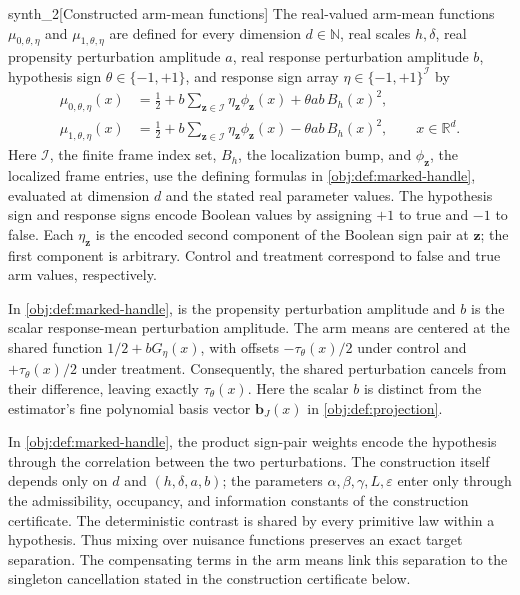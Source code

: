 \documentclass[11pt]{article}
\begin{document}
\begin{definitionv}{synth_2}[Constructed arm-mean functions]
The real-valued arm-mean functions \(\mu_{0,\theta,\eta}\) and \(\mu_{1,\theta,\eta}\) are defined for every dimension \(d\in\mathbb N\), real scales \(h,\delta\), real propensity perturbation amplitude \(a\), real response perturbation amplitude \(b\), hypothesis sign \(\theta\in\{-1,+1\}\), and response sign array \(\eta\in\{-1,+1\}^{\mathcal I}\) by
\[
\begin{aligned}
\mu_{0,\theta,\eta}(x)
&=\frac12+b\sum_{\mathbf z\in\mathcal I}
  \eta_{\mathbf z}\phi_{\mathbf z}(x)
  +\theta ab\,B_h(x)^2,\\
\mu_{1,\theta,\eta}(x)
&=\frac12+b\sum_{\mathbf z\in\mathcal I}
  \eta_{\mathbf z}\phi_{\mathbf z}(x)
  -\theta ab\,B_h(x)^2,
\qquad x\in\mathbb R^d.
\end{aligned}
\]
Here \(\mathcal I\), the finite frame index set, \(B_h\), the localization bump, and \(\phi_{\mathbf z}\), the localized frame entries, use the defining formulas in \cref{obj:def:marked-handle}, evaluated at dimension \(d\) and the stated real parameter values. The hypothesis sign and response signs encode Boolean values by assigning \(+1\) to true and \(-1\) to false. Each \(\eta_{\mathbf z}\) is the encoded second component of the Boolean sign pair at \(\mathbf z\); the first component is arbitrary. Control and treatment correspond to false and true arm values, respectively.
\end{definitionv}



In \cref{obj:def:marked-handle},  is the propensity perturbation amplitude and \(b\) is the scalar response-mean perturbation amplitude. The arm means are centered at the shared function \(1/2+bG_\eta(x)\), with offsets \(-\tau_\theta(x)/2\) under control and \(+\tau_\theta(x)/2\) under treatment. Consequently, the shared perturbation cancels from their difference, leaving exactly \(\tau_\theta(x)\). Here the scalar \(b\) is distinct from the estimator's fine polynomial basis vector \(\mathbf b_J(x)\) in \cref{obj:def:projection}.

In \cref{obj:def:marked-handle}, the product sign-pair weights  encode the hypothesis through the correlation between the two perturbations. The construction itself depends only on \(d\) and \((h,\delta,a,b)\); the parameters \(\alpha,\beta,\gamma,L,\varepsilon\) enter only through the admissibility, occupancy, and information constants of the construction certificate. The deterministic contrast  is shared by every primitive law within a hypothesis. Thus mixing over nuisance functions preserves an exact target separation. The compensating terms in the arm means link this separation to the singleton cancellation stated in the construction certificate below.
\end{document}
